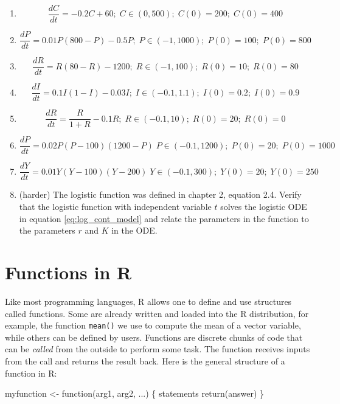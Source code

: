 \documentclass[
  letterpaper,
  DIV=11,
  numbers=noendperiod]{scrreprt}
\newenvironment{Shaded}{\begin{snugshade}}{\end{snugshade}}
\newcommand{\ControlFlowTok}[1]{\textcolor[rgb]{0.00,0.23,0.31}{#1}}
\newcommand{\FunctionTok}[1]{\textcolor[rgb]{0.28,0.35,0.67}{#1}}
\newcommand{\NormalTok}[1]{\textcolor[rgb]{0.00,0.23,0.31}{#1}}
\newcommand{\OtherTok}[1]{\textcolor[rgb]{0.00,0.23,0.31}{#1}}
\begin{document}
\begin{enumerate}
\def\labelenumi{\arabic{enumi}.}
\item
  \[ \frac{dC}{dt} = -0.2C + 60; \; C \in (0,500); \; C(0) = 200; \; C(0) = 400 \]
\item
  \[ \frac{dP}{dt} = 0.01P(800-P) - 0.5P; \; P \in (-1, 1000); \; P(0) = 100; \; P(0) = 800\]
\item
  \[ \frac{dR}{dt} = R(80-R) - 1200; \; R \in (-1, 100); \; R(0) = 10; \; R(0) = 80\]
\item
  \[ \frac{dI}{dt} = 0.1I(1-I) - 0.03I; \;  I \in (-0.1, 1.1); \; I(0) = 0.2; \; I(0) = 0.9 \]
\item
  \[  \frac{dR}{dt} = \frac{R}{1+R}-0.1R; \; R \in (-0.1, 10); \; R(0) = 20; \; R(0) = 0 \]
\item
  \[  \frac{dP}{dt} =  0.02P(P-100)(1200-P) \; P \in (-0.1, 1200); \; P(0) = 20; \; P(0) = 1000 \]
\item
  \[  \frac{dY}{dt} =  0.01Y(Y-100)(Y-200) \; Y \in (-0.1, 300); \; Y(0) = 20; \; Y(0) = 250 \]
\item
  (harder) The logistic function
  was defined in chapter
  2, equation 2.4. Verify that the logistic function with independent
  variable \(t\) solves the logistic ODE in equation
  \ref{eq:log_cont_model} and relate the parameters in the function to
  the parameters \(r\) and \(K\) in the ODE.
\end{enumerate}

\hypertarget{functions-in-r}{%
\section{Functions in R}\label{functions-in-r}}

Like most programming languages, R allows one to define and use
structures called
functions. Some are
already written and loaded into the R distribution, for example, the
function \texttt{mean()} we use to compute the mean of a vector
variable, while others can be defined by users. Functions are discrete
chunks of code that can be \emph{called} from the outside to perform
some task. The function receives inputs from the call and returns the
result back. Here is the general structure of a function in R:

\begin{Shaded}
\begin{Highlighting}[]
\NormalTok{myfunction }\OtherTok{\textless{}{-}} \ControlFlowTok{function}\NormalTok{(arg1, arg2, ...) \{}
\NormalTok{    statements}
    \FunctionTok{return}\NormalTok{(answer)}
\NormalTok{\}}
\end{Highlighting}
\end{Shaded}
\end{document}
